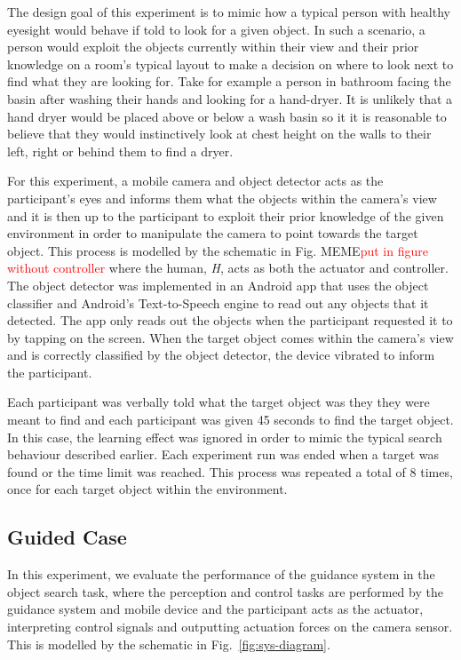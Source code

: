 \documentclass[runningheads]{llncs}
\newcommand\todo[1]{\textcolor{red}{#1}}
\begin{document}
The design goal of this experiment is to mimic how a typical person with healthy eyesight would behave if told to look for a given object. 
In such a scenario, a person would exploit the objects currently within their view and their prior knowledge on a room's typical layout to make a decision on where to look next to find what they are looking for. 
Take for example a person in bathroom facing the basin after washing their hands and looking for a hand-dryer. 
It is unlikely that a hand dryer would be placed above or below a wash basin so it it is reasonable to believe that they would instinctively look at chest height on the walls to their left, right or behind them to find a dryer. 

For this experiment, a mobile camera and object detector acts as the participant's eyes and informs them what the objects within the camera's view and it is then up to the participant to exploit their prior knowledge of the given environment in order to manipulate the camera to point towards the target object. 
This process is modelled by the schematic in Fig. MEME\todo{put in figure without controller} where the human, \emph{H}, acts as both the actuator and controller.
The object detector was implemented in an Android app that uses the object classifier and Android's Text-to-Speech engine to read out any objects that it detected. 
The app only reads out the objects when the participant requested it to by tapping on the screen. 
When the target object comes within the camera's view and is correctly classified by the object detector, the device vibrated to inform the participant. 

Each participant was verbally told what the target object was they they were meant to find and each participant was given 45 seconds to find the target object. 
In this case, the learning effect was ignored in order to mimic the typical search behaviour described earlier. 
Each experiment run was ended when a target was found or the time limit was reached. 
This process was repeated a total of 8 times, once for each target object within the environment. 

\subsection{Guided Case}

In this experiment, we evaluate the performance of the guidance system in the object search task, where the perception and control tasks are performed by the guidance system and mobile device and the participant acts as the actuator, interpreting control signals and outputting actuation forces on the camera sensor. 
This is modelled by the schematic in Fig.~\ref{fig:sys-diagram}. 
\end{document}
